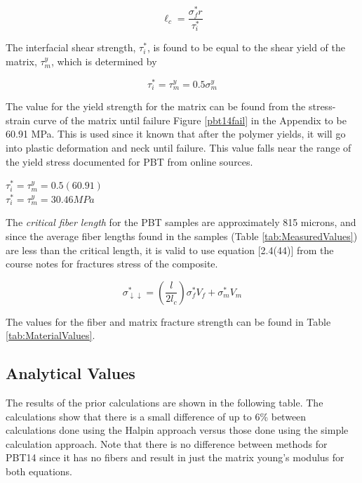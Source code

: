 \documentclass[11pt]{article}
\begin{document}
\begin{equation}
\ell_c = \frac{\sigma^*_f r}{\tau^*_i}
\end{equation}

The interfacial shear strength, \(\tau^*_i\), is found to be equal to the shear yield of the matrix, \(\tau^y_m\), which is determined by

\begin{equation}
\tau^*_i = \tau^y_m = 0.5 \sigma^y_m
\end{equation}

The value for the yield strength for the matrix can be found from the stress-strain curve of the matrix until failure Figure \ref{pbt14fail} in the Appendix to be 60.91 MPa. This is used since it known that after the polymer yields, it will go into plastic deformation and neck until failure. This value falls near the range of the yield stress documented for PBT from online sources.

\begin{center}

\(\tau^*_i = \tau^y_m = 0.5(60.91)\)
\\
\(\tau^*_i = \tau^y_m = 30.46 MPa\)

\end{center}

The \textit{critical fiber length} for the PBT samples are approximately 815 microns, and since the average fiber lengths found in the samples (Table \ref{tab:MeasuredValues}) are less than the critical length, it is valid to use equation [2.4(44)] from the course notes \cite{course_notes} for fractures stress of the composite. 

\begin{equation} \label{eq:fracture}
\sigma^*_{\downarrow \downarrow} = \left( \frac{l}{2l_c}\right) \sigma_f^* V_f + \sigma^*_m V_m
\end{equation}

The values for the fiber and matrix fracture strength can be found in Table \ref{tab:MaterialValues}.

\subsection{Analytical Values}

The results of the prior calculations are shown in the following table. The calculations show that there is a small difference of up to 6\% between calculations done using the Halpin approach versus those done using the simple calculation approach. Note that there is no difference between methods for PBT14 since it has no fibers and result in just the matrix young's modulus for both equations.
\end{document}
